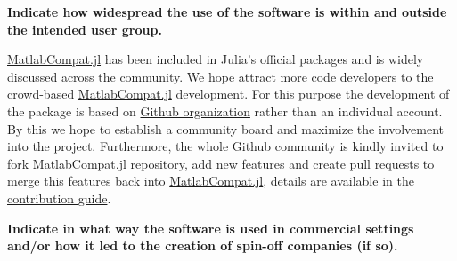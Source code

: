 \textbf{Indicate how widespread the use of the software is within and outside the intended user group.}

\href{https://github.com/MatlabCompat/MatlabCompat.jl}{MatlabCompat.jl} has been included in Julia's official packages and is widely discussed across the community. We hope attract more code developers to the crowd-based \href{https://github.com/MatlabCompat/MatlabCompat.jl}{MatlabCompat.jl} development. For this purpose the development of the package is based on \href{http://matlabcompat.github.io/}{Github organization} rather than an individual account. By this we hope to establish a community board and maximize the involvement into the project. Furthermore, the whole Github community is kindly invited to fork \href{https://github.com/MatlabCompat/MatlabCompat.jl}{MatlabCompat.jl} repository, add new features and create pull requests to merge this features back into \href{https://github.com/MatlabCompat/MatlabCompat.jl}{MatlabCompat.jl}, details are available in the \href{http://matlabcompat.github.io/contribute.html}{contribution guide}.

\textbf{Indicate in what way the software is used in commercial settings and/or how it led to the creation of spin-off companies (if so).}
  
  